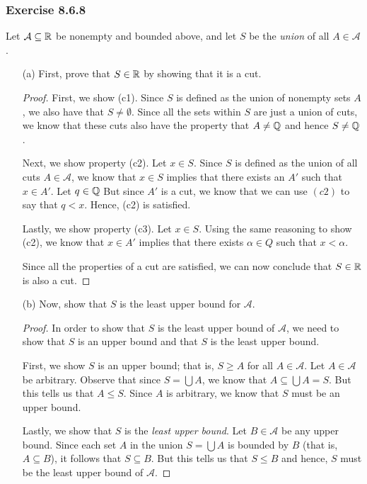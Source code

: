 \subsubsection{Exercise 8.6.8} 
Let \( \mathcal{A} \subseteq \mathbb{R}  \) be nonempty and bounded above, and let \( S  \) be the \textit{union} of all \( A \in \mathcal{A}  \).  
\begin{enumerate}
    \item[(a)] First, prove that \( S \in \mathbb{R}  \) by showing that it is a cut.
        \begin{proof}
            First, we show (c1). Since \( S  \) is defined as the union of nonempty sets \( A  \), we also have that \( S \neq \emptyset \). Since all the sets within \( S   \) are just a union of cuts, we know that these cuts also have the property that \( A \neq \mathbb{Q}  \) and hence \( S \neq \mathbb{Q}  \).

            Next, we show property (c2). Let \( x \in S  \). Since \( S  \) is defined as the union of all cuts \( A \in \mathcal{A}  \), we know that \( x \in S  \) implies that there exists an \( A'  \) such that \(  x \in A'  \). Let \( q \in \mathbb{Q}  \) But since \( A'  \) is a cut, we know that we can use \( (c2)  \) to say that \( q < x  \). Hence, (c2) is satisfied.
            
            Lastly, we show property (c3). Let \( x \in S  \). Using the same reasoning to show (c2), we know that \( x \in A'  \) implies that there exists \( \alpha \in Q  \) such that \( x < \alpha   \).
        
            Since all the properties of a cut are satisfied, we can now conclude that \( S  \in \mathbb{R}   \) is also a cut.
        \end{proof}
    \item[(b)] Now, show that \( S  \) is the least upper bound for \( \mathcal{A} \).
        \begin{proof}
            In order to show that  \( S  \) is the least upper bound of \( \mathcal{A}  \), we need to show that \( S  \) is an upper bound and that \( S  \) is the least upper bound.
        
            First, we show \( S  \) is an upper bound; that is, \( S \geq A  \) for all \( A \in \mathcal{A} \). Let \( A \in \mathcal{A} \) be arbitrary. Observe that since \( S = \bigcup A  \), we know that \( A \subseteq \bigcup A = S  \). But this tells us that \( A \leq S  \). Since \( A  \) is arbitrary, we know that \( S  \) must be an upper bound.      

            Lastly, we show that \( S  \) is the \textit{least upper bound}. Let \( B \in \mathcal{A}  \) be any upper bound. Since each set \( A  \) in the union \( S = \bigcup A  \) is bounded by \( B  \) (that is, \( A \subseteq B\)), it follows that \( S \subseteq B  \). But this tells us that \(  S \leq B  \) and hence, \(  S  \) must be the least upper bound of \( \mathcal{A} \).
        \end{proof}
\end{enumerate}

